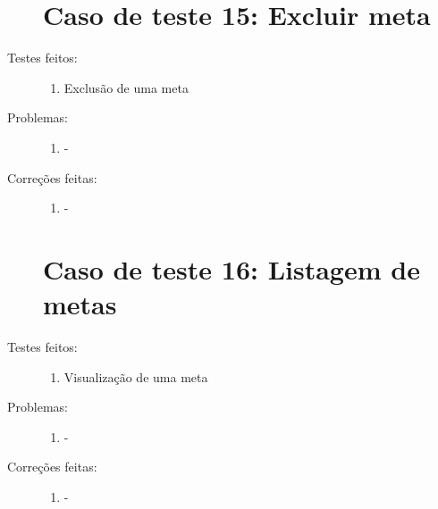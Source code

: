 \begin{description}
  \section{Caso de teste 15: Excluir meta}
  \item[Testes feitos:]
  \begin{enumerate}
    \item{Exclusão de uma meta}
  \end{enumerate}
  \item[Problemas:]
  \begin{enumerate}
    \item{-}
  \end{enumerate}
  \item[Correções feitas:]
  \begin{enumerate}
    \item{-}
  \end{enumerate}

  \section{Caso de teste 16: Listagem de metas}
  \item[Testes feitos:]
  \begin{enumerate}
    \item{Visualização de uma meta}
  \end{enumerate}
  \item[Problemas:]
  \begin{enumerate}
    \item{-}
  \end{enumerate}
  \item[Correções feitas:]
  \begin{enumerate}
    \item{-}
  \end{enumerate}

\end{description}